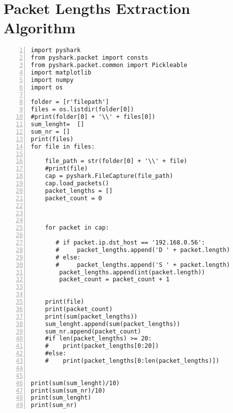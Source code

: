 \chapter{Packet Lengths Extraction Algorithm}
\label{app:Packetlengthex}


\begin{lstlisting}[numbers=left]
     import pyshark
from pyshark.packet import consts
from pyshark.packet.common import Pickleable
import matplotlib
import numpy
import os

folder = [r'filepath']
files = os.listdir(folder[0])
#print(folder[0] + '\\' + files[0])
sum_lenght=  []
sum_nr = []
print(files)
for file in files:

    file_path = str(folder[0] + '\\' + file)
    #print(file)
    cap = pyshark.FileCapture(file_path)
    cap.load_packets()
    packet_lengths = []
    packet_count = 0
    
    

    for packet in cap:
        
       # if packet.ip.dst_host == '192.168.0.56':
       #     packet_lengths.append('D ' + packet.length)
       # else:
       #     packet_lengths.append('S ' + packet.length)
        packet_lengths.append(int(packet.length))
        packet_count = packet_count + 1


    print(file)
    print(packet_count)
    print(sum(packet_lengths))
    sum_lenght.append(sum(packet_lengths))
    sum_nr.append(packet_count)
    #if len(packet_lengths) >= 20:
    #    print(packet_lengths[0:20])
    #else:
    #    print(packet_lengths[0:len(packet_lengths)])


print(sum(sum_lenght)/10)   
print(sum(sum_nr)/10)
print(sum_lenght)   
print(sum_nr)    
    \end{lstlisting}